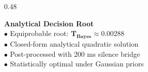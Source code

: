 \documentclass[aspectratio=169, 10pt]{beamer}
\begin{document}
\begin{frame}
\begin{tcolorbox}[contentframe]
\begin{columns}[T]
    \begin{column}{0.48\textwidth}
      \begin{tcolorbox}[mintcard, height=3.0cm, valign=top]
        {\fontsize{9pt}{10pt}\selectfont\color{mintGreen}\textbf{Analytical Decision Root}}\\[3pt]
        {\fontsize{8pt}{10pt}\selectfont
        $\bullet$ Equiprobable root: $\mathbf{T_{\text{Bayes}} \approx 0.00288}$\\[2pt]
        $\bullet$ Closed-form analytical quadratic solution\\[2pt]
        $\bullet$ Post-processed with 200 ms silence bridge\\[2pt]
        $\bullet$ Statistically optimal under Gaussian priors}
      \end{tcolorbox}
    \end{column}
  \end{columns}
  \end{tcolorbox}
\end{frame}

\end{document}
